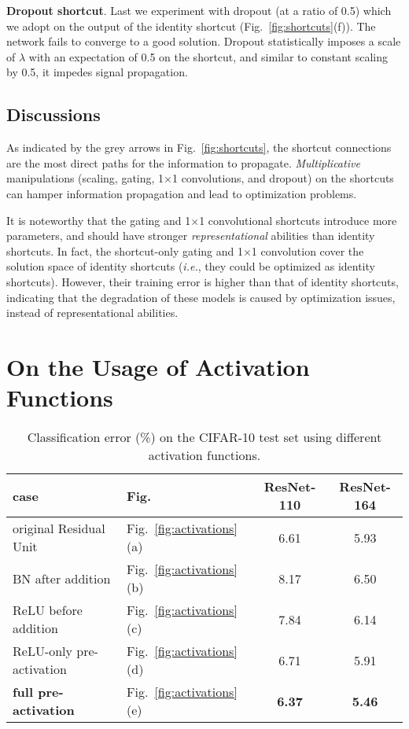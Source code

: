 \documentclass[runningheads]{llncs}
\def\ie{\emph{i.e.}}
\begin{document}
\textbf{Dropout shortcut}. Last we experiment with dropout \cite{Hinton2012} (at a ratio of 0.5) which we adopt on the output of the identity shortcut (Fig.~\ref{fig:shortcuts}(f)). The network fails to converge to a good solution. Dropout statistically imposes a scale of $\lambda$ with an expectation of 0.5 on the shortcut, and similar to constant scaling by 0.5, it impedes signal propagation.

\subsection{Discussions}

As indicated by the grey arrows in Fig.~\ref{fig:shortcuts}, the shortcut connections are the most direct paths for the information to propagate. \emph{Multiplicative} manipulations (scaling, gating, 1$\times$1 convolutions, and dropout) on the shortcuts can hamper information propagation and lead to optimization problems.

It is noteworthy that the gating and 1$\times$1 convolutional shortcuts introduce more parameters, and should have stronger \emph{representational} abilities than identity shortcuts. In fact, the shortcut-only gating and 1$\times$1 convolution cover the solution space of identity shortcuts (\ie, they could be optimized as identity shortcuts). However, their training error is higher than that of identity shortcuts, indicating that the degradation of these models is caused by optimization issues, instead of representational abilities.


\section{On the Usage of Activation Functions}
\label{sec:activations}


\renewcommand\arraystretch{1.3}
\setlength{\tabcolsep}{6pt}
\begin{table}[t]
\caption{Classification error (\%) on the CIFAR-10 test set using different activation functions.}\label{tab:activations}
\centering
\fontsize{8pt}{1em}\selectfont
\begin{tabular}{l|l|c|c}
\hline
case & Fig. & ResNet-110 & ResNet-164 \\
\hline
\hline
original Residual Unit \cite{He2016} & Fig.~\ref{fig:activations}(a) & 6.61 & 5.93 \\
\hline
BN after addition & Fig.~\ref{fig:activations}(b) & 8.17 & 6.50 \\
\hline
ReLU before addition & Fig.~\ref{fig:activations}(c) & 7.84 & 6.14 \\
ReLU-only pre-activation & Fig.~\ref{fig:activations}(d) & 6.71 & 5.91 \\
\textbf{full pre-activation} & Fig.~\ref{fig:activations}(e) & \textbf{6.37} & \textbf{5.46} \\
\hline
\end{tabular}
\end{table}
\end{document}

